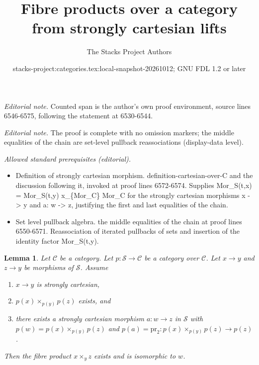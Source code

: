 \documentclass{stacks-project}
\title{Fibre products over a category from strongly cartesian lifts}
\author{The Stacks Project Authors}
\date{stacks-project:categories.tex:local-snapshot-20261012; GNU FDL 1.2 or later}
\theoremstyle{plain}
\newtheorem{lemma}[subsection]{Lemma}
\theoremstyle{definition}
\theoremstyle{remark}
\numberwithin{equation}{subsection}
\begin{document}
\maketitle
\noindent\textit{Editorial note.} Counted span is the author's own proof environment, source lines 6546-6575, following the statement at 6530-6544.\par\medskip
\noindent\textit{Editorial note.} The proof is complete with no omission markers; the middle equalities of the chain are set-level pullback reassociations (display-data level).\par\medskip
\noindent\textit{Allowed standard prerequisites (editorial).}\begin{itemize}
\item Definition of strongly cartesian morphism. definition-cartesian-over-C and the discussion following it, invoked at proof lines 6572-6574. Supplies Mor\_S(t,x) = Mor\_S(t,y) x\_\{Mor\_C\} Mor\_C for the strongly cartesian morphisms x -> y and a: w -> z, justifying the first and last equalities of the chain.
\item Set level pullback algebra. the middle equalities of the chain at proof lines 6550-6571. Reassociation of iterated pullbacks of sets and insertion of the identity factor Mor\_S(t,y).
\end{itemize}\medskip
\begin{lemma}
\label{lemma-strongly-cartesian-fibre-product}
Let $\mathcal{C}$ be a category.
Let $p : \mathcal{S} \to \mathcal{C}$ be a category over $\mathcal{C}$.
Let $x \to y$ and $z \to y$ be morphisms of $\mathcal{S}$.
Assume
\begin{enumerate}
\item $x \to y$ is strongly cartesian,
\item $p(x) \times_{p(y)} p(z)$ exists, and
\item there exists a strongly cartesian morphism $a : w \to z$ in
$\mathcal{S}$ with $p(w) = p(x) \times_{p(y)} p(z)$ and
$p(a) = \text{pr}_2 : p(x) \times_{p(y)} p(z) \to p(z)$.
\end{enumerate}
Then the fibre product $x \times_y z$ exists and is isomorphic to $w$.
\end{lemma}
\end{document}
